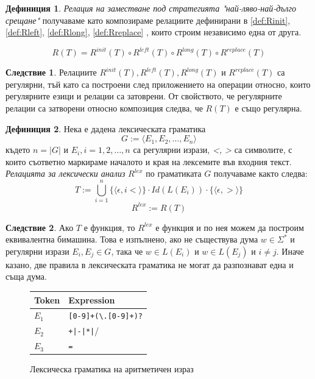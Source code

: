 \documentclass[12pt, oneside]{article}
\theoremstyle{definition}
\newtheorem{definition}{Дефиниция}[section]
\newtheorem{corollary}{Следствие}[section]
\begin{document}
\begin{definition} \emph{Релация на заместване под стратегията "най-ляво-най-дълго срещане"} получаваме като композираме релациите дефинирани в \ref{def:Rinit}, \ref{def:Rleft}, \ref{def:Rlong}, \ref{def:Rreplace} , които строим независимо една от друга.

\[ R(T) = R^{init}(T) \circ R^{left}(T) \circ R^{long}(T) \circ R^{replace}(T) \]
\end{definition}

\begin{corollary}
	Релациите \( R^{init}(T), R^{left}(T), R^{long}(T) \) и \( R^{replace}(T) \) са регулярни, тъй като са построени след приложението на операции относно, които регулярните езици и релации са затоврени. От свойството, че регулярните релации са затворени относно композиция следва, че \( R(T)\) е също регулярна.
\end{corollary}

\begin{definition} \label{def:Rlex}
	Нека е дадена лексическата граматика
	\[ G := \langle E_1, E_2, \dots , E_n \rangle \]
	където \(n = |G|\) и \( E_i, i = 1, 2, \dots, n \) са регулярни изрази, \emph{<, >} са символите, с които съответно маркираме началото и края на лексемите във входния текст. \emph{Релацията за лексически анализ} \(R^{lex}\) по граматиката \(G\) получаваме както следва:
	\[ T := \bigcup_{i=1}^{n} \{ \langle \epsilon, i < \rangle \} 	\cdot Id(L(E_i)) \cdot \{ \langle \epsilon, > \rangle \} \]
	\[ R^{lex} := R(T) \]
\end{definition}

\begin{corollary}
	Ако \(T\) е функция, то \(R^{lex} \) е функция и по нея можем да построим еквивалентна бимашина. Това е изпълнено, ако не съществува дума \( w \in \Sigma^* \) и регулярни изрази \( E_i, E_j \in G \), така че \( w \in L(E_i)\text{ и } w \in L(E_j) \) и \( i \neq j \). Иначе казано, две правила в лексическата граматика не могат да разпознават една и съща дума.
\end{corollary}

\begin{figure}[!htb]
	\begin{center}
		\begin{tabular}{ |l|l| }
		\hline
		Token & Expression \\
		\hline
		\( E_1 \) & \verb/[0-9]+(\.[0-9]+)?/ \\
		\( E_2 \) & \verb/+|-|*|// \\
		\( E_3 \) & \verb/=/ \\
		\hline
		\end{tabular}
	\end{center}
	\caption{Лексическа граматика на аритметичен израз}
	\label{fig:ArGram}
\end{figure}
\end{document}
